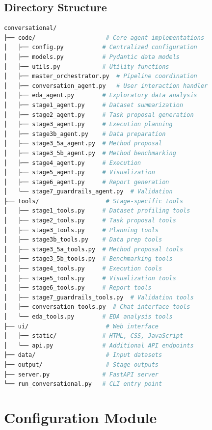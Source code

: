 \documentclass[12pt,a4paper]{report}
\begin{document}
\section{Directory Structure}
\begin{lstlisting}[language=bash]
conversational/
├── code/                    # Core agent implementations
│   ├── config.py           # Centralized configuration
│   ├── models.py           # Pydantic data models
│   ├── utils.py            # Utility functions
│   ├── master_orchestrator.py  # Pipeline coordination
│   ├── conversation_agent.py   # User interaction handler
│   ├── eda_agent.py        # Exploratory data analysis
│   ├── stage1_agent.py     # Dataset summarization
│   ├── stage2_agent.py     # Task proposal generation
│   ├── stage3_agent.py     # Execution planning
│   ├── stage3b_agent.py    # Data preparation
│   ├── stage3_5a_agent.py  # Method proposal
│   ├── stage3_5b_agent.py  # Method benchmarking
│   ├── stage4_agent.py     # Execution
│   ├── stage5_agent.py     # Visualization
│   ├── stage6_agent.py     # Report generation
│   └── stage7_guardrails_agent.py  # Validation
├── tools/                   # Stage-specific tools
│   ├── stage1_tools.py     # Dataset profiling tools
│   ├── stage2_tools.py     # Task proposal tools
│   ├── stage3_tools.py     # Planning tools
│   ├── stage3b_tools.py    # Data prep tools
│   ├── stage3_5a_tools.py  # Method proposal tools
│   ├── stage3_5b_tools.py  # Benchmarking tools
│   ├── stage4_tools.py     # Execution tools
│   ├── stage5_tools.py     # Visualization tools
│   ├── stage6_tools.py     # Report tools
│   ├── stage7_guardrails_tools.py  # Validation tools
│   ├── conversation_tools.py  # Chat interface tools
│   └── eda_tools.py        # EDA analysis tools
├── ui/                      # Web interface
│   ├── static/             # HTML, CSS, JavaScript
│   └── api.py              # Additional API endpoints
├── data/                    # Input datasets
├── output/                  # Stage outputs
├── server.py               # FastAPI server
└── run_conversational.py   # CLI entry point
\end{lstlisting}

\chapter{Configuration Module}
\end{document}
